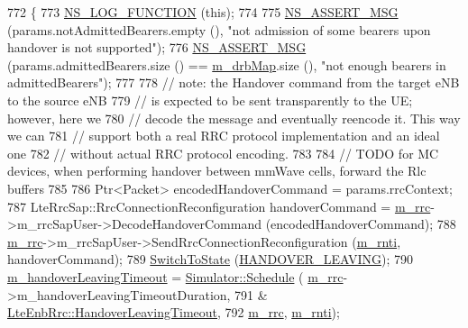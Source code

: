\begin{DoxyCode}
772 \{
773   \hyperlink{log-macros-disabled_8h_a90b90d5bad1f39cb1b64923ea94c0761}{NS\_LOG\_FUNCTION} (\textcolor{keyword}{this});
774 
775   \hyperlink{assert_8h_aff5ece9066c74e681e74999856f08539}{NS\_ASSERT\_MSG} (params.notAdmittedBearers.empty (), \textcolor{stringliteral}{"not admission of some bearers upon
       handover is not supported"});
776   \hyperlink{assert_8h_aff5ece9066c74e681e74999856f08539}{NS\_ASSERT\_MSG} (params.admittedBearers.size () == \hyperlink{classns3_1_1UeManager_a18499c025730b63c73e5d93effff57aa}{m\_drbMap}.size (), \textcolor{stringliteral}{"not enough
       bearers in admittedBearers"});
777 
778   \textcolor{comment}{// note: the Handover command from the target eNB to the source eNB}
779   \textcolor{comment}{// is expected to be sent transparently to the UE; however, here we}
780   \textcolor{comment}{// decode the message and eventually reencode it. This way we can}
781   \textcolor{comment}{// support both a real RRC protocol implementation and an ideal one}
782   \textcolor{comment}{// without actual RRC protocol encoding. }
783 
784   \textcolor{comment}{// TODO for MC devices, when performing handover between mmWave cells, forward the Rlc buffers}
785 
786   Ptr<Packet> encodedHandoverCommand = params.rrcContext;
787   LteRrcSap::RrcConnectionReconfiguration handoverCommand = \hyperlink{classns3_1_1UeManager_ab4405e9f354c66e7c1a4c95832290f5b}{m\_rrc}->m\_rrcSapUser->DecodeHandoverCommand
       (encodedHandoverCommand);
788   \hyperlink{classns3_1_1UeManager_ab4405e9f354c66e7c1a4c95832290f5b}{m\_rrc}->m\_rrcSapUser->SendRrcConnectionReconfiguration (\hyperlink{classns3_1_1UeManager_a5a72b4fe818f21993bd7f05d7e2c4f83}{m\_rnti}, handoverCommand);
789   \hyperlink{classns3_1_1UeManager_af2b5ad90fc6f16ffc4a91fbe8a522472}{SwitchToState} (\hyperlink{classns3_1_1UeManager_a2f4085fdd18d7125c27da44a5b8b6808ae67953d7b8e117cbd2cab21a1fcde8ad}{HANDOVER\_LEAVING});
790   \hyperlink{classns3_1_1UeManager_aebe46172b4387024c856c6917b5e2d6b}{m\_handoverLeavingTimeout} = \hyperlink{classns3_1_1Simulator_a671882c894a08af4a5e91181bf1eec13}{Simulator::Schedule} (
      \hyperlink{classns3_1_1UeManager_ab4405e9f354c66e7c1a4c95832290f5b}{m\_rrc}->m\_handoverLeavingTimeoutDuration, 
791                                                   &
      \hyperlink{classns3_1_1LteEnbRrc_a3ded0535ab2c7f5b1346cf787745d06d}{LteEnbRrc::HandoverLeavingTimeout}, 
792                                                   \hyperlink{classns3_1_1UeManager_ab4405e9f354c66e7c1a4c95832290f5b}{m\_rrc}, \hyperlink{classns3_1_1UeManager_a5a72b4fe818f21993bd7f05d7e2c4f83}{m\_rnti});

\end{DoxyCode}
